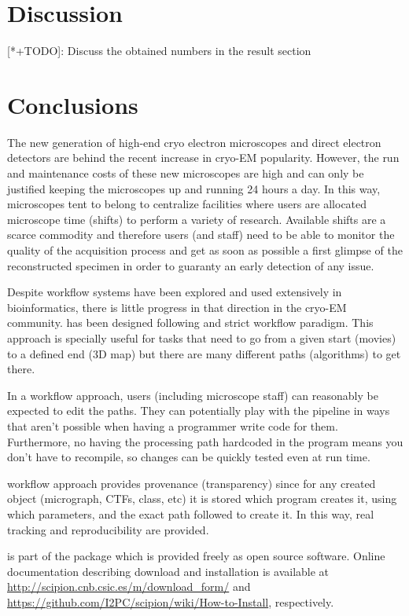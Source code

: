 \section{Discussion}
[*+TODO]: Discuss the obtained numbers in the result section

\section{Conclusions}

The new generation of high-end cryo electron microscopes and direct electron detectors are behind the recent increase in cryo-EM  popularity. However, the run and maintenance costs of these new microscopes are high and can only be justified keeping the microscopes up and running 24 hours a day. In this way, microscopes tent to belong to centralize facilities where users are allocated microscope time (shifts) to perform a variety of research. Available shifts are a scarce commodity and therefore users (and staff) need to be able to monitor the quality of the acquisition process and get as soon as possible a first glimpse of the reconstructed specimen in order to guaranty an early detection of any issue. 

 Despite workflow systems have been explored and used extensively in bioinformatics, there is little progress in that direction in the cryo-EM community. \scipionbox has been designed following and strict workflow paradigm. This approach is specially useful for tasks that need to go from a given start (movies) to a defined end (3D map) but there are many different paths (algorithms) to get there.
 
 In a workflow approach, users (including microscope staff) can reasonably be expected to edit the paths. They can potentially play with the pipeline in ways that aren't possible when having a programmer write code for them. Furthermore, no having the processing path hardcoded in the program means you don't have to recompile, so changes can be quickly tested   even at run time.
 
 \scipionbox workflow approach provides provenance (transparency) since for any created object (micrograph, CTFs, class, etc) it is stored which program creates it, using which parameters, and the exact path followed to create it.  In this way,  real tracking and reproducibility are provided. 

 
\scipionbox is part of the \scipion package which is provided 
freely as open source software. Online documentation
describing \scipion download and installation is available
at \url{http://scipion.cnb.csic.es/m/download_form/} and \url{https://github.com/I2PC/scipion/wiki/How-to-Install}, respectively.\\\\


